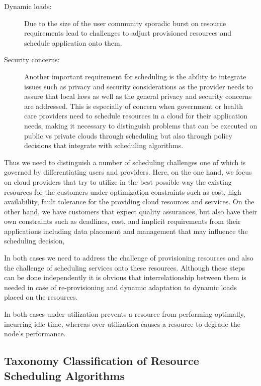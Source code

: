 \documentclass[final,5p,times,twocolumn]{elsarticle}
\begin{document}
\begin{description}
\item[Dynamic loads:] Due to the size of the user community sporadic
  burst on resource requirements lead to challenges to adjust
  provisioned resources and schedule application onto them.

\item[Security concerns:] Another important requirement for scheduling
  is the ability to integrate issues such as privacy and security
  considerations as the provider needs to assure that local laws as
  well as the general privacy and security concerns are addressed.
  This is especially of concern when government or health care
  providers need to schedule resources in a cloud for their
  application needs, making it necessary to distinguish problems that
  can be executed on public vs private clouds through scheduling but
  also through policy decisions that integrate with scheduling
  algorithms.
  
\end{description}

Thus we need to distinguish a number of scheduling challenges one of
which is governed by differentiating users and providers. Here, on
the one hand, we focus on cloud providers that try to utilize in the
best possible way the existing resources for the customers under
optimization constraints such as cost, high availability, fault
tolerance for the providing cloud resources and services. On the other
hand, we have customers that expect quality assurances, but also
have their own constraints such as deadlines, cost, and implicit
requirements from their applications including data placement and
management that may influence the scheduling decision,

In both cases we need to address the challenge of provisioning
resources and also the challenge of scheduling services onto these
resources. Although these steps can be done independently it is
obvious that interrelationship between them is needed in case of
re-provisioning and dynamic adaptation to dynamic loads placed on the
resources.

In both cases under-utilization prevents a resource from performing
optimally, incurring idle time, whereas over-utilization causes a
resource to degrade the node's performance.





\subsection{Taxonomy Classification of Resource Scheduling Algorithms}\label{S:algo}
\end{document}
